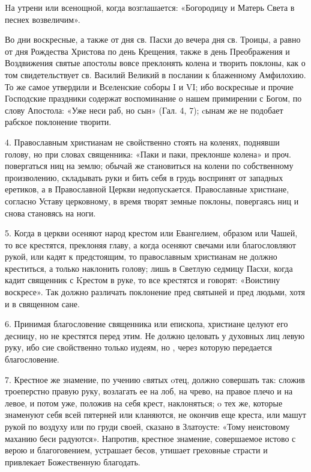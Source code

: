 Hа утрени или всенощной, когда возглашается: «Богородицу и Матерь Света в песнех возвеличим». 



Во дни воскресные, а также от дня св. Пасхи до вечера дня св. Троицы, а равно от дня Рождества Христова по день Крещения, также в день Преображения и Воздвижения святые апостолы  вовсе преклонять колена и творить  поклоны, как о том свидетельствует св. Василий Великий в послании к блаженному Амфилохию. То же самое утвердили и Вселенские соборы I и VI; ибо воскресные и прочие Господские праздники содержат воспоминание о нашем примирении с Богом, по слову Апостола: «Уже неси раб, но сын» (Гал. 4, 7); cынам же не подобает рабское поклонение творити. 



4. Православным христианам не свойственно стоять на коленях, поднявши голову, но при словах священника: «Паки и паки, преклонше колена» и проч. повергаться ниц на землю; обычай же становиться на колени по собственному произволению, складывать руки и бить себя в грудь воспринят от западных еретиков, а в Православной Церкви недопускается. Православные христиане, согласно Уставу церковному, в  время творят земные поклоны, повергаясь ниц и снова становясь на ноги. 



5. Когда в церкви осеняют народ крестом или Евангелием, образом или Чашей, то все крестятся, преклоняя главу, а когда осеняют свечами или благословляют рукой, или кадят к предстоящим, то православным христианам не должно креститься, а только наклонить голову; лишь в Светлую седмицу Пасхи, когда кадит священник с Kрестом в руке, то все крестятся и говорят: «Воистину воскресе». Так должно различать поклонение пред святыней и пред людьми, хотя и в священном сане. 



6. Принимая благословение священника или епископа, христиане целуют его десницу, но не крестятся перед этим. Не должно целовать у духовных лиц левую руку, ибо сие свойственно только иудеям, но , через которую передается благословение. 



7. Крестное же знамение, по учению cвятых oтец, должно совершать так: сложив троеперстно правую руку, возлагать ее на лоб, на чрево, на правое плечо и на левое, и потом уже, положив на себя крест, наклоняться;  o тех же, которые знаменуют себя всей пятерней или кланяются, не окончив еще креста, или машут рукой по воздуху или по груди своей, сказано в Златоусте: «Тому неистовому маханию беси радуются». Напротив, крестное знамение, совершаемое истово с верою и благоговением, устрашает бесов, утишает греховные страсти и привлекает Божественную благодать. 




